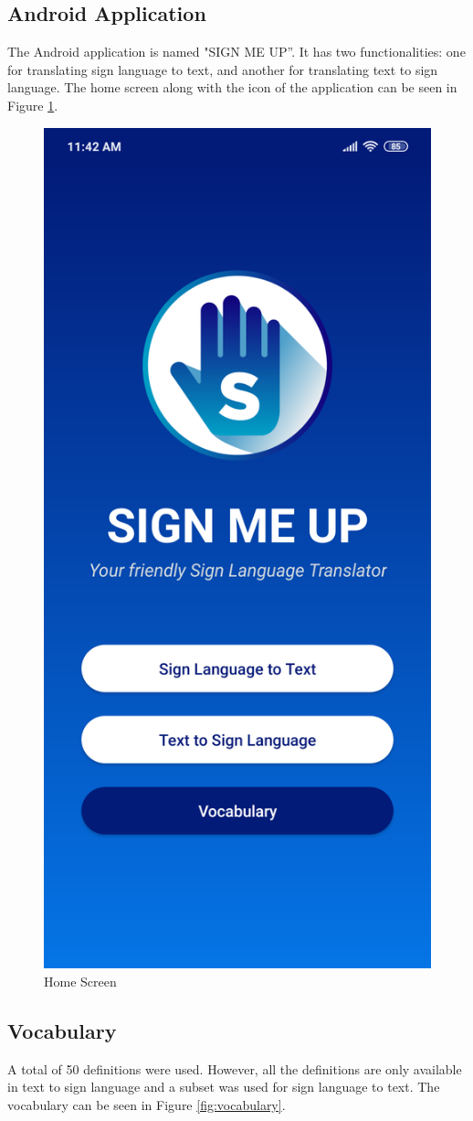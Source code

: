 \documentclass[journal]{./IEEE/IEEEtran}
\begin{document}
\subsection{Android Application}
The Android application is named "SIGN ME UP''. It has two functionalities: one for translating sign language to text, and another for translating text to sign language. The home screen along with the icon of the application can be seen in Figure \ref{fig:home}.

\begin{figure}[ht!]
    \centering
    \includegraphics[width=0.58\linewidth]{./images/screen_home.png}
    \caption{Home Screen}
    \label{fig:home}
\end{figure}

\subsection{Vocabulary}
A total of 50 definitions were used. However, all the definitions are only available in text to sign language and a subset was used for sign language to text. The vocabulary can be seen in Figure \ref{fig:vocabulary}. 
\end{document}
